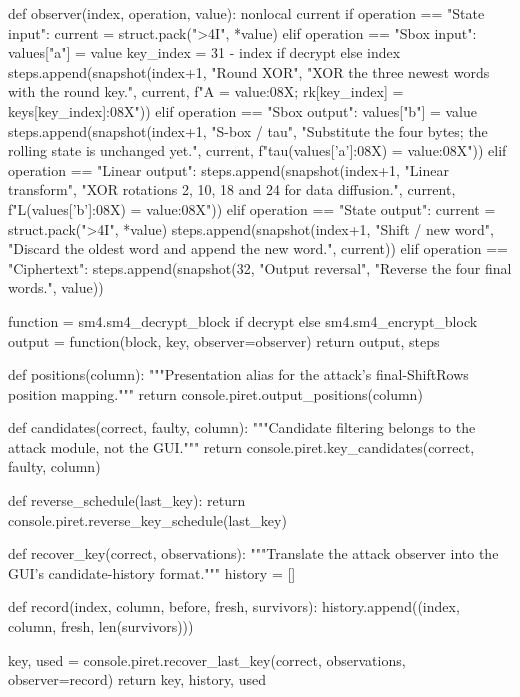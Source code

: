 \begin{lightcode}[numbers=left,firstnumber=1]
    def observer(index, operation, value):
        nonlocal current
        if operation == "State input":
            current = struct.pack(">4I", *value)
        elif operation == "Sbox input":
            values["a"] = value
            key_index = 31 - index if decrypt else index
            steps.append(snapshot(index+1, "Round XOR", "XOR the three newest words with the round key.", current, f"A = {value:08X}; rk[{key_index}] = {keys[key_index]:08X}"))
        elif operation == "Sbox output":
            values["b"] = value
            steps.append(snapshot(index+1, "S-box / tau", "Substitute the four bytes; the rolling state is unchanged yet.", current, f"tau({values['a']:08X}) = {value:08X}"))
        elif operation == "Linear output":
            steps.append(snapshot(index+1, "Linear transform", "XOR rotations 2, 10, 18 and 24 for data diffusion.", current, f"L({values['b']:08X}) = {value:08X}"))
        elif operation == "State output":
            current = struct.pack(">4I", *value)
            steps.append(snapshot(index+1, "Shift / new word", "Discard the oldest word and append the new word.", current))
        elif operation == "Ciphertext":
            steps.append(snapshot(32, "Output reversal", "Reverse the four final words.", value))

    function = sm4.sm4_decrypt_block if decrypt else sm4.sm4_encrypt_block
    output = function(block, key, observer=observer)
    return output, steps


def positions(column):
    """Presentation alias for the attack's final-ShiftRows position mapping."""
    return console.piret.output_positions(column)


def candidates(correct, faulty, column):
    """Candidate filtering belongs to the attack module, not the GUI."""
    return console.piret.key_candidates(correct, faulty, column)


def reverse_schedule(last_key):
    return console.piret.reverse_key_schedule(last_key)


def recover_key(correct, observations):
    """Translate the attack observer into the GUI's candidate-history format."""
    history = []

    def record(index, column, before, fresh, survivors):
        history.append((index, column, fresh, len(survivors)))

    key, used = console.piret.recover_last_key(correct, observations, observer=record)
    return key, history, used



\end{lightcode}
